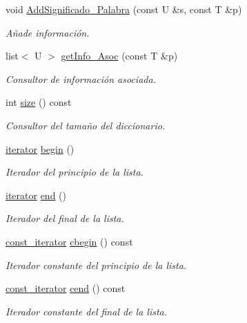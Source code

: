\begin{DoxyCompactItemize}
void \hyperlink{classDiccionario_a7e167da231bff610001df3c20cc9b7a7}{Add\+Significado\+\_\+\+Palabra} (const U \&s, const T \&p)
\begin{DoxyCompactList}\small\item\em Añade información. \end{DoxyCompactList}\item 
list$<$ U $>$ \hyperlink{classDiccionario_ad262cd8d8e11286beecfa4851ec2c948}{get\+Info\+\_\+\+Asoc} (const T \&p)
\begin{DoxyCompactList}\small\item\em Consultor de información asociada. \end{DoxyCompactList}\item 
int \hyperlink{classDiccionario_aa576b001759429fd58210ca57257d6f8}{size} () const
\begin{DoxyCompactList}\small\item\em Consultor del tamaño del diccionario. \end{DoxyCompactList}\item 
\hyperlink{classDiccionario_1_1iterator}{iterator} \hyperlink{classDiccionario_aa17ce3d7317d78f5927ae7c0564089cc}{begin} ()
\begin{DoxyCompactList}\small\item\em Iterador del principio de la lista. \end{DoxyCompactList}\item 
\hyperlink{classDiccionario_1_1iterator}{iterator} \hyperlink{classDiccionario_adb5cdbfce59b4005bd07473273df3a8e}{end} ()
\begin{DoxyCompactList}\small\item\em Iterador del final de la lista. \end{DoxyCompactList}\item 
\hyperlink{classDiccionario_1_1const__iterator}{const\+\_\+iterator} \hyperlink{classDiccionario_a8d18a8044a6c1a1482762fd84ab37017}{cbegin} () const
\begin{DoxyCompactList}\small\item\em Iterador constante del principio de la lista. \end{DoxyCompactList}\item 
\hyperlink{classDiccionario_1_1const__iterator}{const\+\_\+iterator} \hyperlink{classDiccionario_ac4e5b5c7800bf3df103ca6b58f118598}{cend} () const
\begin{DoxyCompactList}\small\item\em Iterador constante del final de la lista. \end{DoxyCompactList}\item 

\end{DoxyCompactItemize}
